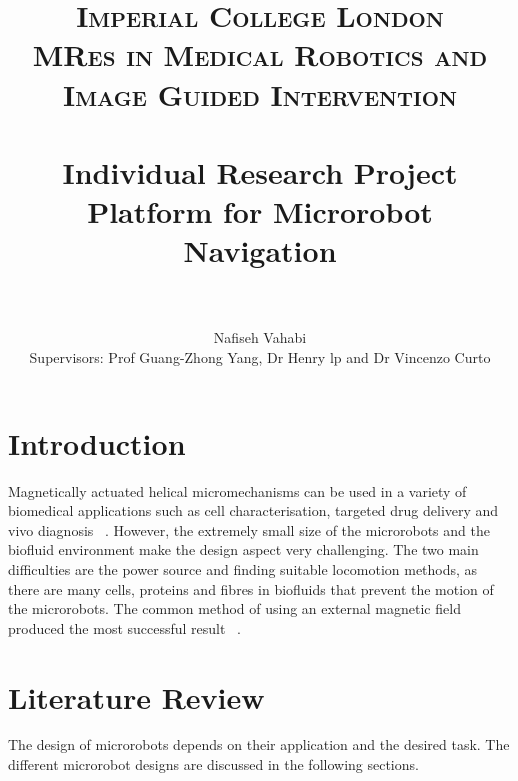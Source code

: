 \documentclass[a4paper,11pt]{article}
\title{
\normalfont \normalsize
\textsc{Imperial College London\\
MRes in Medical Robotics and Image Guided Intervention} \\ [1pt] %
\horrule{0.5pt} \\[0.4cm] %
\huge Individual Research Project \\
Platform for Microrobot Navigation \\ %
\horrule{2pt} \\[0.1cm] %
}
\author{
        Nafiseh Vahabi\\
	Supervisors: Prof Guang-Zhong Yang, Dr Henry lp and Dr Vincenzo Curto
}
\begin{document}



\begin{sloppypar}


\maketitle
\thispagestyle{plain}


\section{Introduction}

Magnetically actuated helical micromechanisms can be used
 in a variety of biomedical applications such as cell characterisation, targeted drug delivery and vivo 
diagnosis ~\citep{peyer2013magnetic}. However, the extremely small size of the microrobots and the
 biofluid environment make the design aspect
very challenging. The two main difficulties are the power source and finding suitable locomotion methods, as
 there are many cells, proteins and fibres in biofluids that prevent the motion of the microrobots. 
The common method of using an external magnetic field produced the most successful result ~\citep{peyer2013bio}. 
\paragraph{}



\section{Literature Review}

The design of microrobots depends on their application and the desired task. The different microrobot designs are discussed in the following sections.

\paragraph{}

\end{sloppypar}
\end{document}
